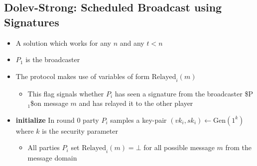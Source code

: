 \documentclass[11pt]{article}
\begin{document}
\subsection{Dolev-Strong: Scheduled Broadcast using Signatures}
\label{sec:orga28f420}
\begin{itemize}
\item A solution which works for any \(n\) and any \(t< n\)
\item \(P_1\) is the broadcaster
\item The protocol makes use of variables of form \(\text{Relayed}_i(m)\)
\begin{itemize}
\item This flag signals whether \(P_i\) has seen a signature from the broadcaster \$P\(_{\text{1}}\)\$on message  \(m\) and has relayed it to the other player
\end{itemize}

\item \textbf{initialize} In round \(0\) party \(P_i\) samples a key-pair \((vk_i,sk_i) \leftarrow \text{Gen}(1^k)\) where \(k\) is the security parameter
\begin{itemize}
\item All parties \(P_i\) set \(\text{Relayed}_i(m) = \bot\) for all possible message \(m\) from the message domain
\end{itemize}


\end{itemize}
\end{document}
